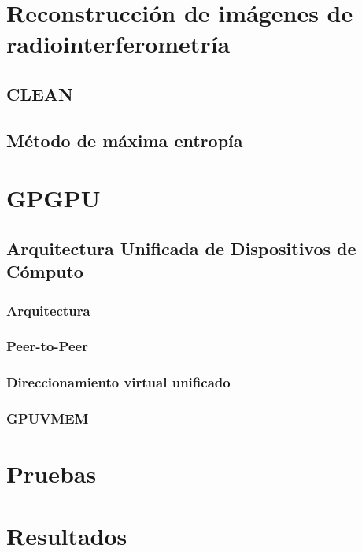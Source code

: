 \chapter{Reconstrucción de imágenes de radiointerferometría}
\label{cap:imagesynthesisinterferometry}
\section{CLEAN}
\section{Método de máxima entropía}


\chapter{GPGPU}
\label{cap:gpgpu}

\section{Arquitectura Unificada de Dispositivos de Cómputo}
\subsection{Arquitectura}
\subsection{Peer-to-Peer}
\subsection{Direccionamiento virtual unificado}
\subsection{GPUVMEM}

\chapter{Pruebas}
\label{cap:pruebas}

\chapter{Resultados}
\label{cap:resultados}
